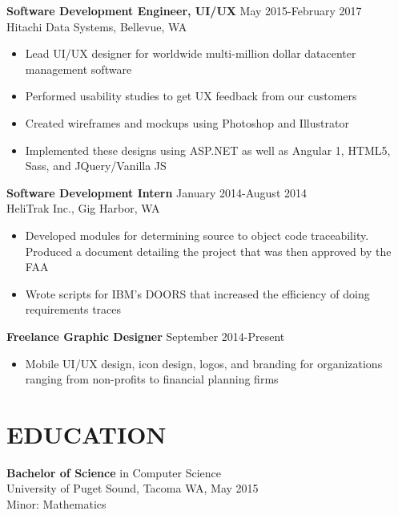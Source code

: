 \documentclass[margin]{res}
\begin{document}
\begin{resume}
 {\bf Software Development Engineer, UI/UX} \hfill May 2015-February 2017 \\ 
                Hitachi Data Systems, Bellevue, WA 
                 \begin{itemize}  \itemsep -2pt %
                 \item   Lead UI/UX designer for worldwide multi-million dollar datacenter management software
                 \item Performed usability studies to get UX feedback from our customers
                \item   Created wireframes and mockups using Photoshop and Illustrator
                \item Implemented these designs using ASP.NET as well as Angular 1, HTML5, Sass, and JQuery/Vanilla JS
                \end{itemize}
                 {\bf Software Development Intern} \hfill January 2014-August 2014 \\ 
                HeliTrak Inc., Gig Harbor, WA
                \begin{itemize}  \itemsep -2pt %
                 \item Developed modules for determining source to object code traceability. Produced a document detailing the project that was then approved by the FAA
                 \item Wrote scripts for IBM’s DOORS that increased the efficiency of doing requirements traces
                \end{itemize}            
                {\bf Freelance Graphic Designer} \hfill September 2014-Present  
                 \begin{itemize}  \itemsep -2pt %
                 \item   Mobile UI/UX design, icon design, logos, and branding for organizations ranging from non-profits to financial planning firms    
                \end{itemize}    
                
\section{EDUCATION} {\bf Bachelor of Science} in Computer Science \\
                University of Puget Sound, Tacoma WA, 
                May 2015 \\
                Minor: Mathematics \\
					

\end{resume}
\end{document}
